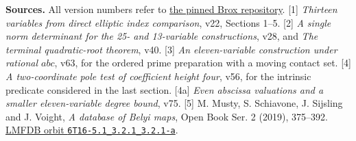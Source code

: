\documentclass[11pt]{article}
\begin{document}
\smallskip
\noindent\textbf{Sources.} All version numbers refer to
\href{https://github.com/JoseBrox/diophantine-z-q_improvements/tree/d3a8c223716a0fc0dbf5af4eb7998d640c21048d}{the pinned Brox repository}.
[1] \emph{Thirteen variables from direct elliptic index comparison}, v22, Sections 1--5.
[2] \emph{A single norm determinant for the 25- and 13-variable constructions}, v28, and \emph{The terminal quadratic-root theorem}, v40.
[3] \emph{An eleven-variable construction under rational $abc$}, v63, for the ordered prime preparation with a moving contact set.
[4] \emph{A two-coordinate pole test of coefficient height four}, v56, for the intrinsic predicate considered in the last section.
[4a] \emph{Even abscissa valuations and a smaller eleven-variable degree bound}, v75.
[5] M. Musty, S. Schiavone, J. Sijsling and J. Voight, \emph{A database of Belyi maps}, Open Book Ser. 2 (2019), 375--392. \href{https://www.lmfdb.org/Belyi/6T16/5.1/3.2.1/3.2.1/a/}{LMFDB orbit \texttt{6T16-5.1\_3.2.1\_3.2.1-a}}.
\end{document}
